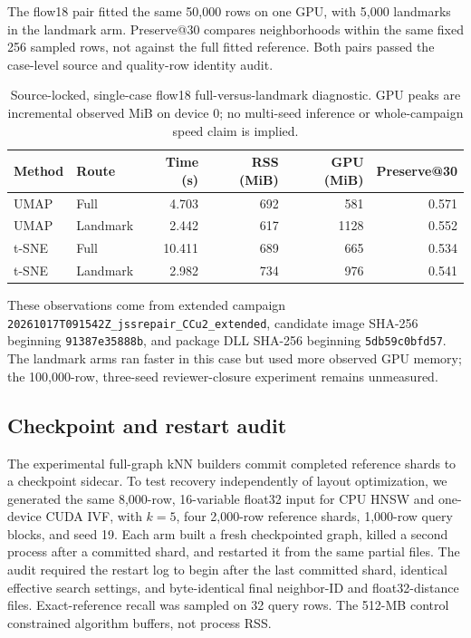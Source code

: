\documentclass[article]{jss}
\begin{document}
The flow18 pair fitted the same 50,000 rows on one GPU, with 5,000
landmarks in the landmark arm. Preserve@30 compares neighborhoods within
the same fixed 256 sampled rows, not against the full fitted reference.
Both pairs passed the case-level source and quality-row identity audit.

\begin{table}[htbp]
\centering
\scriptsize
\caption{Source-locked, single-case flow18 full-versus-landmark diagnostic.
  GPU peaks are incremental observed MiB on device 0; no multi-seed
  inference or whole-campaign speed claim is implied.}
\label{tab:flow18-single-pair}
\begin{tabular}{llrrrr}
\toprule
Method & Route & Time (s) & RSS (MiB) & GPU (MiB) & Preserve@30 \\
\midrule
UMAP & Full & 4.703 & 692 & 581 & 0.571 \\
UMAP & Landmark & 2.442 & 617 & 1128 & 0.552 \\
t-SNE & Full & 10.411 & 689 & 665 & 0.534 \\
t-SNE & Landmark & 2.982 & 734 & 976 & 0.541 \\
\bottomrule
\end{tabular}
\end{table}

These observations come from extended campaign
\texttt{20261017T091542Z\_jssrepair\_CCu2\_extended}, candidate image
SHA-256 beginning \texttt{91387e35888b}, and package DLL SHA-256 beginning
\texttt{5db59c0bfd57}. The landmark arms ran faster in this case but used
more observed GPU memory; the 100,000-row, three-seed reviewer-closure
experiment remains unmeasured.

\subsection{Checkpoint and restart audit}

The experimental full-graph kNN builders commit completed reference
shards to a checkpoint sidecar. To test recovery independently of layout
optimization, we generated the same 8,000-row, 16-variable float32
input for CPU HNSW and one-device CUDA IVF, with $k=5$, four 2,000-row
reference shards, 1,000-row query blocks, and seed 19. Each arm built a
fresh checkpointed graph, killed a second process after a committed
shard, and restarted it from the same partial files. The audit required
the restart log to begin after the last committed shard, identical
effective search settings, and byte-identical final neighbor-ID and
float32-distance files. Exact-reference recall was sampled on 32 query
rows. The 512-MB control constrained algorithm buffers, not process RSS.
\end{document}
